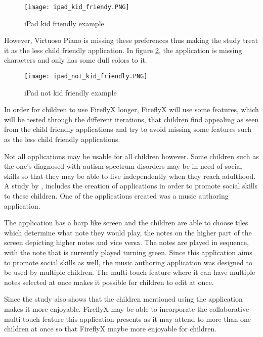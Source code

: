 \begin{figure}[H]
    \centering
    \texttt{[image: ipad\_kid\_friendy.PNG]}
    \caption{iPad kid friendly example \protect\cite{burton2016music}}
    \label{fig:iPad_friendly}
\end{figure}

However, Virtuoso Piano is missing these preferences thus making the study treat it as the less child friendly application. In figure \ref{fig:iPad_unfriendly}, the application is missing characters and only has some dull colors to it. 

\begin{figure}[H]
    \centering
    \texttt{[image: ipad\_not\_kid\_friendly.PNG]}
    \caption{iPad not kid friendly example \protect\cite{burton2016music}}
    \label{fig:iPad_unfriendly}
\end{figure}

In order for children to use FireflyX longer, FireflyX will use some features, which will be tested through the different iterations, that children find appealing as seen from the child friendly applications and try to avoid missing some features such as the less child friendly applications.


Not all applications may be usable for all children however. Some children such as the one’s diagnosed with autism spectrum disorders may be in need of social skills so that they may be able to live independently when they reach adulthood. A study by , includes the creation of applications in order to promote social skills to these children. One of the applications created was a music authoring application. 

The application has a harp like screen and the children are able to choose tiles which determine what note they would play, the notes on the higher part of the screen depicting higher notes and vice versa. The notes are played in sequence, with the note that is currently played turning green. Since this application aims to promote social skills as well, the music authoring application was designed to be used by multiple children. The multi-touch feature where it can have multiple notes selected at once makes it possible for children to edit at once. 

Since the study also shows that the children mentioned using the application makes it more enjoyable. FireflyX may be able to incorporate the collaborative multi touch feature this application presents as it may attend to more than one children at once so that FireflyX maybe more enjoyable for children.

